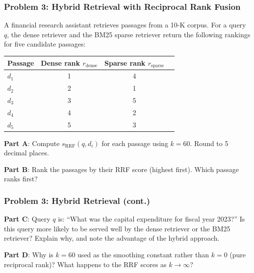 \documentclass[9pt,t]{beamer}
\begin{document}
\begin{frame}
\frametitle{Problem 3: Hybrid Retrieval with Reciprocal Rank Fusion}

A financial research assistant retrieves passages from a 10-K corpus. For a query $q$, the dense retriever and the BM25 sparse retriever return the following rankings for five candidate passages:

\begin{center}
\begin{tabular}{lccc}
\toprule
Passage & Dense rank $r_{\text{dense}}$ & Sparse rank $r_{\text{sparse}}$ & \\
\midrule
$d_1$ & 1 & 4 & \\
$d_2$ & 2 & 1 & \\
$d_3$ & 3 & 5 & \\
$d_4$ & 4 & 2 & \\
$d_5$ & 5 & 3 & \\
\bottomrule
\end{tabular}
\end{center}

\textbf{Part A}: Compute $s_{\text{RRF}}(q, d_i)$ for each passage using $k = 60$. Round to 5 decimal places.

\textbf{Part B}: Rank the passages by their RRF score (highest first). Which passage ranks first?
\end{frame}

\begin{frame}
\frametitle{Problem 3: Hybrid Retrieval (cont.)}

\textbf{Part C}: Query $q$ is: ``What was the capital expenditure for fiscal year 2023?'' Is this query more likely to be served well by the dense retriever or the BM25 retriever? Explain why, and note the advantage of the hybrid approach.

\medskip
\textbf{Part D}: Why is $k = 60$ used as the smoothing constant rather than $k = 0$ (pure reciprocal rank)? What happens to the RRF scores as $k \to \infty$?
\end{frame}
\end{document}
